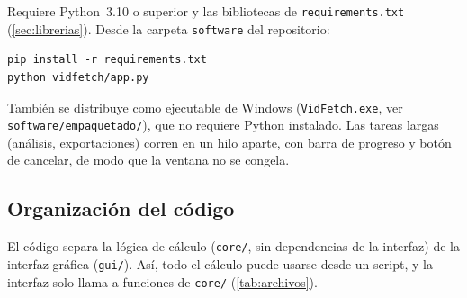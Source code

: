 Requiere Python~3.10 o superior y las bibliotecas de \texttt{requirements.txt}
(\cref{sec:librerias}). Desde la carpeta \texttt{software} del repositorio:
\begin{verbatim}
pip install -r requirements.txt
python vidfetch/app.py
\end{verbatim}
También se distribuye como ejecutable de Windows (\texttt{VidFetch.exe}, ver
\texttt{software/empaquetado/}), que no requiere Python instalado.
Las tareas largas (análisis, exportaciones) corren en un hilo aparte, con barra de progreso y botón
de cancelar, de modo que la ventana no se congela.

\subsection{Organización del código}

El código separa la lógica de cálculo (\texttt{core/}, sin dependencias de la interfaz) de la
interfaz gráfica (\texttt{gui/}). Así, todo el cálculo puede usarse desde un script, y la interfaz
solo llama a funciones de \texttt{core/} (\cref{tab:archivos}).

